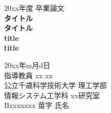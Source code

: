 \documentclass[11pt,a4j]{jreport} %
\begin{document}
\thispagestyle{empty} %
\begin{center}

\vspace{20mm}
{\Large\noindent 20xx年度 卒業論文}\\
\vspace{40mm}
{\huge\noindent\textbf{タイトル}}\\ %
\medskip
{\huge\noindent\textbf{タイトル}}\\ %
\vspace{\baselineskip}
{\huge\noindent\textbf{title}}\\ %
\medskip
{\huge\noindent\textbf{title}}\\ %
\vspace{40mm}

{\Large\noindent
20xx年m月d日\\
\vspace{\baselineskip}
指導教員 xx xx    \\
\vspace{\baselineskip}
公立千歳科学技術大学 理工学部\\
情報システム工学科 xx研究室\\
\vspace{\baselineskip}
Bxxxxxxx 苗字 氏名\\
}
\vspace{40mm}

\end{center}

\clearpage %

\tableofcontents
\clearpage

\lhead{\rightmark}
\renewcommand{\chaptermark}[1]{\markboth{第\ \normalfont\thechapter\ 章~~#1}{}}

\end{document}
